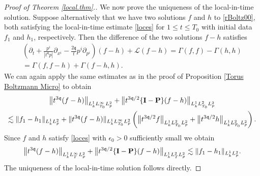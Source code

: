 \documentclass[reqno]{amsart}
\newcommand{\pv}{p}
\def\norm#1{\big\Vert#1\big\Vert}
\newcommand{\qq}{\mathfrak{q}}
\newcommand{\tq}{t^{\qq}}
\newcommand{\tTq}{t^{3\qq}}
\newcommand{\linL}{\mathcal{L}}
\newcommand{\micro}{{\bf \{I- P\}}}
\theoremstyle{definition}
\numberwithin{equation}{section}
\numberwithin{theorem}{section}
\begin{document}
\begin{proof}[Proof of Theorem \ref{local.thm}.]
We now prove the uniqueness of the local-in-time solution.  Suppose alternatively that we have two solutions $f$ and $h$ to \eqref{rBoltz00}, both satisfying the local-in-time estimate \eqref{loces} for $1 \leq t \leq T_0$ with initial data $f_1$ and $h_1$, respectively.  Then the difference of the two solutions $f-h$ satisfies
\begin{multline*}
               \left( \partial_t + \frac{\pv^i}{|\tq \pv|}\partial_{x^i} 
    -\frac{2\qq }{t} p^i \partial_{p^i} \right) \left( f-h\right)
    +
    \linL \left( f-h\right)
=
\Gamma (f,f)-\Gamma (h,h)
\\
=
\Gamma (f,f-h)+\Gamma (f-h,h).
\end{multline*}
We can again apply the same estimates as in the proof of Proposition \ref{Torus Boltzmann Micro} to obtain
\begin{multline}\notag
\norm{\tTq (f-h)}_{L^1_kL^\infty_{T_0}L^2_{\pv}}
+
{\norm{t^{3\qq/2}\micro (f-h)}_{L^1_kL^2_{T_0}L^2_{\pv}}}
\\
\lesssim 
\Vert {f}_1-{h}_1\Vert_{L^1_kL^2_{\pv}}
+
{\Vert{\tTq (f-h)}\Vert_{L^1_kL^\infty_{T_0}L^2_{\pv}}}
\left( {\norm{t^{3\qq/2} f}_{L^1_kL^2_{T_0}L^2_{\pv}}} +{\norm{t^{3\qq/2} h}_{L^1_kL^2_{T_0}L^2_{\pv}}}\right).
\end{multline}
Since $f$ and $h$ satisfy \eqref{loces} with $\epsilon_0>0$ sufficiently small we obtain
\begin{equation*}
    \norm{\tTq (f-h)}_{L^1_kL^\infty_TL^2_{\pv}}
+
{\norm{t^{3\qq/2}\micro (f-h)}_{L^1_kL^2_TL^2_{\pv}}}
\lesssim 
\Vert {f}_1-{h}_1\Vert_{L^1_kL^2_{\pv}}.
\end{equation*}
The uniqueness of the local-in-time solution follows directly.



\end{proof}
\end{document}
